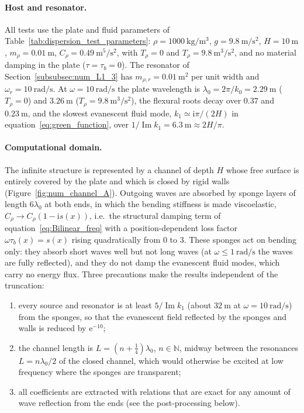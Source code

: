 {\paragraph{Host and resonator.} All tests use the plate and fluid parameters of Table~\ref{tab:dispersion_test_parameters}: $\rho=1000~\si{\kilogram\per\meter\cubed}$, $g=9.8~\si{\meter\per\second\squared}$, $H=10~\si{\meter}$, $m_\rho=0.01~\si{\meter}$, $C_\rho=0.49~\si{\meter\tothe{5}\per\second\squared}$, with $T_\rho=0$ and $T_\rho=9.8~\si{\meter\cubed\per\second\squared}$, and no material damping in the plate ($\tau=\tau_b=0$). The resonator of Section~\ref{subsubsec:num_L1_3} has $m_{\rho,r}=0.01~\si{\meter\squared}$ per unit width and $\omega_r=10~\si{\radian\per\second}$. At $\omega=10~\si{\radian\per\second}$ the plate wavelength is $\lambda_0=2\pi/k_0=2.29~\si{\meter}$ ($T_\rho=0$) and $3.26~\si{\meter}$ ($T_\rho=9.8~\si{\meter\cubed\per\second\squared}$), the flexural roots decay over $0.37$ and $0.23~\si{\meter}$, and the slowest evanescent fluid mode, $k_1\simeq\mathrm{i}\pi/(2H)$ in equation~\eqref{eq:green_function}, over $1/\operatorname{Im}k_1=6.3~\si{\meter}\approx2H/\pi$.

\paragraph{Computational domain.} The infinite structure is represented by a channel of depth $H$ whose free surface is entirely covered by the plate and which is closed by rigid walls (Figure~\ref{fig:num_channel_A}). Outgoing waves are absorbed by sponge layers of length $6\lambda_0$ at both ends, in which the bending stiffness is made viscoelastic, $C_\rho\to C_\rho(1-\mathrm{i}s(x))$, i.e.\ the structural damping term of equation~\eqref{eq:Bilinear_freq} with a position-dependent loss factor $\omega\tau_b(x)=s(x)$ rising quadratically from $0$ to $3$. These sponges act on bending only: they absorb short waves well but not long waves (at $\omega\le1~\si{\radian\per\second}$ the waves are fully reflected), and they do not damp the evanescent fluid modes, which carry no energy flux. Three precautions make the results independent of the truncation:
\begin{enumerate}
    \item every source and resonator is at least $5/\operatorname{Im}k_1$ (about $32~\si{\meter}$ at $\omega=10~\si{\radian\per\second}$) from the sponges, so that the evanescent field reflected by the sponges and walls is reduced by $\mathrm{e}^{-10}$;
    \item the channel length is $L=(n+\tfrac14)\lambda_0$, $n\in\mathbb{N}$, midway between the resonances $L=n\lambda_0/2$ of the closed channel, which would otherwise be excited at low frequency where the sponges are transparent;
    \item all coefficients are extracted with relations that are exact for any amount of wave reflection from the ends (see the post-processing below).
\end{enumerate}

}
